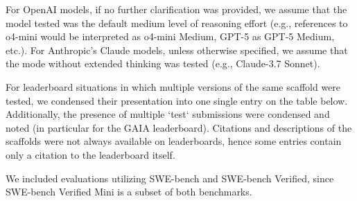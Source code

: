 For OpenAI models, if no further clarification was provided, we assume that the model tested was the  default medium level of reasoning effort (e.g., references to o4-mini would be interpreted as o4-mini Medium, GPT-5 as GPT-5 Medium, etc.). For Anthropic's Claude models, unless otherwise specified, we assume that the mode without extended thinking was tested (e.g., Claude-3.7 Sonnet).

For leaderboard situations in which multiple versions of the same scaffold were tested, we condensed their presentation into one single entry on the table below. Additionally, the presence of multiple `test` submissions were condensed and noted (in particular for the GAIA leaderboard). Citations and descriptions of the scaffolds were not always available on leaderboards, hence some entries contain only a citation to the leaderboard itself. 

We included evaluations utilizing SWE-bench and SWE-bench Verified, since SWE-bench Verified Mini is a subset of both benchmarks.

